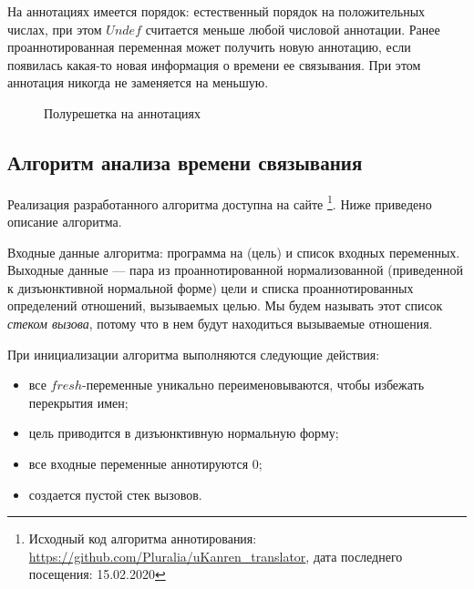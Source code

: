 \documentclass[conference,american,russian]{IEEEtran}
\begin{document}
На аннотациях имеется порядок: естественный порядок на положительных числах, при этом $Undef$ считается меньше любой числовой аннотации.
Ранее проаннотированная переменная может получить новую аннотацию, если появилась какая-то новая информация о времени ее связывания.
При этом аннотация никогда не заменяется на меньшую. 

\begin{figure}[htbp]
  \centering
  \caption{Полурешетка на аннотациях}
  \label{fig:image}
\end{figure}

\subsection{Алгоритм анализа времени связывания}

Реализация разработанного алгоритма доступна на сайте \github{}\footnote{Исходный код алгоритма аннотирования: \url{https://github.com/Pluralia/uKanren\_translator}, дата последнего посещения: 15.02.2020}. Ниже приведено описание алгоритма.

Входные данные алгоритма: программа на \miniKanren{} (цель) и список входных переменных.
Выходные данные --- пара из проаннотированной нормализованной (приведенной к дизъюнктивной нормальной форме) цели и списка проаннотированных определений отношений, вызываемых целью. 
Мы будем называть этот список \emph{стеком вызова}, потому что в нем будут находиться вызываемые отношения.

При инициализации алгоритма выполняются следующие действия: 
\begin{itemize}
    \item все $fresh$-переменные уникально переименовываются, чтобы избежать перекрытия имен;
    \item цель приводится в дизъюнктивную нормальную форму;
    \item все входные переменные аннотируются $0$;
    \item создается пустой стек вызовов.
\end{itemize}
\end{document}
